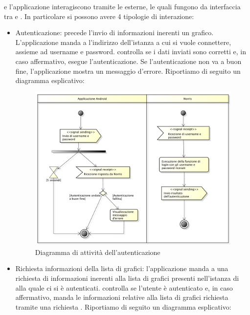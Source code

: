          e l'applicazione  interagiscono tramite le  esterne, le quali fungono da interfaccia tra  e . In particolare si possono avere 4 tipologie di interazione:
        \begin{itemize}
            \item Autenticazione: precede l'invio di informazioni inerenti un grafico. L'applicazione  manda a  l'indirizzo dell'istanza a cui si vuole connettere, assieme ad username e password.  controlla se i dati inviati sono corretti e, in caso affermativo, esegue l'autenticazione. Se l'autenticazione non va a buon fine, l'applicazione  mostra un messaggio d'errore. Riportiamo di seguito un diagramma esplicativo:
        	\begin{figure}[H]\centering
        		\includegraphics[width=\textwidth]{SpecificaTecnica/Pics/Applicazione/Autenticazione.pdf}
        		\caption{Diagramma di attività dell'autenticazione}
    		\end{figure}
            \item Richiesta informazioni della lista di grafici: l'applicazione  manda a  una richiesta di informazioni inerenti alla lista di grafici presenti nell'istanza di  alla quale ci si è autenticati.  controlla se l'utente è autenticato e, in caso affermativo, manda le informazioni relative alla lista di grafici richiesta tramite una richiesta . Riportiamo di seguito un diagramma esplicativo:

\end{itemize}
